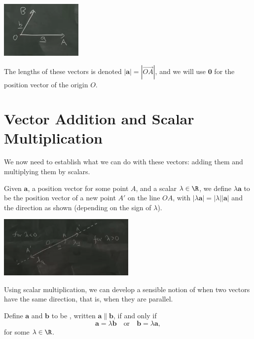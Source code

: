 \documentclass[a4]{scrreprt}
\begin{document}
\begin{center}
	\includegraphics[width=0.3\textwidth]{vector_intro.png}
\end{center}

The lengths of these vectors is denoted $|\mathbf{a}| = |\overrightarrow{OA}|$, and we will use $\mathbf{0}$ for the position vector of the origin $O$.

\section{Vector Addition and Scalar Multiplication}

We now need to establish what we can do with these vectors: adding them and multiplying them by scalars.

\begin{definition}
	Given $\mathbf{a}$, a position vector for some point $A$, and a scalar $\lambda \in \R$, we define $\lambda \mathbf{a}$ to be the position vector of a new point $A'$ on the line $OA$, with $|\lambda \mathbf{a}| = |\lambda||\mathbf{a}|$ and the direction as shown (depending on the sign of $\lambda$).
	\begin{center}
		\includegraphics[width=0.5\textwidth]{scalar_multiplication.png}
	\end{center}
\end{definition}

Using scalar multiplication, we can develop a sensible notion of when two vectors have the same direction, that is, when they are parallel.

\begin{definition}[Parallelism]
	Define $\mathbf{a}$ and $\mathbf{b}$ to be , written $\mathbf{a} \parallel \mathbf{b}$, if and only if
	$$
	\mathbf{a} = \lambda \mathbf{b} \quad \text{or} \quad \mathbf{b} = \lambda \mathbf{a},
	$$
	for some $\lambda \in \R$.
\end{definition}
\end{document}
